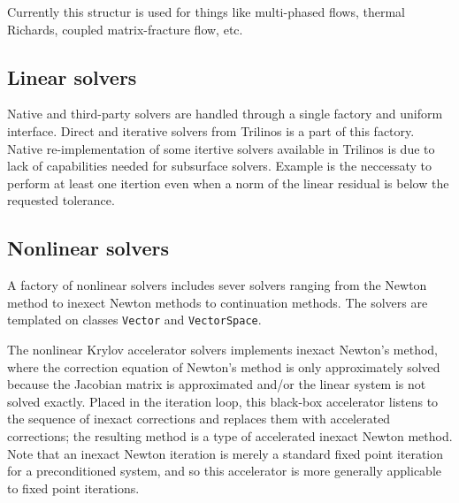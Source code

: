 Currently this structur is used for things like multi-phased flows, 
thermal Richards, coupled matrix-fracture flow, etc.


\subsection{Linear solvers}
Native and third-party solvers are handled through a single factory and 
uniform interface.
Direct and iterative solvers from Trilinos is a part of this factory.
Native re-implementation of some itertive solvers available in Trilinos
is due to lack of capabilities needed for subsurface solvers.
Example is the neccessaty to perform at least one itertion even when
a norm of the linear residual is below the requested tolerance.


\subsection{Nonlinear solvers}
A factory of nonlinear solvers includes sever solvers ranging from
the Newton method to inexect Newton methods to continuation methods.
The solvers are templated on classes {\tt Vector} and {\tt VectorSpace}.

The nonlinear Krylov accelerator solvers \cite{carlson1998design} implements
inexact Newton's method, where the correction 
equation of Newton's method is only approximately solved because the 
Jacobian matrix is approximated and/or the linear system is not solved exactly.  
Placed in the iteration loop, this black-box accelerator listens to the sequence
of inexact corrections and replaces them with accelerated corrections;
the resulting method is a type of accelerated inexact Newton method.
Note that an inexact Newton iteration is merely a standard fixed point iteration for
a preconditioned system, and so this accelerator is more generally
applicable to fixed point iterations.


